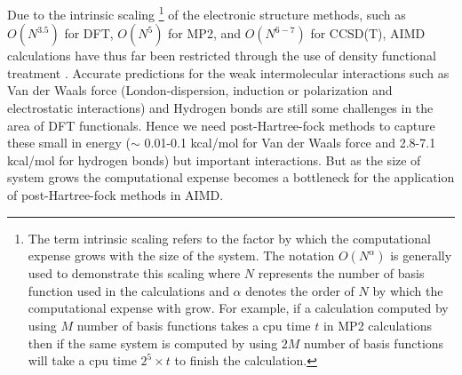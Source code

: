 Due to the intrinsic scaling \footnote{The term intrinsic scaling refers to the factor by
which the computational expense grows with the size of the system. The notation $O(N^{\alpha})$
is generally used to demonstrate this scaling where $N$ represents the number of basis function
used in the calculations and $\alpha$ denotes the order of $N$ by which the computational expense
with grow. For example, if a calculation computed by using $M$ number of basis functions takes
a cpu time $t$ in MP2 calculations then if the same system is computed by using $2M$ number of
basis functions will take a cpu time $2^{5} \times t$ to finish the calculation.} of the
electronic structure methods, such as 
$O(N^{3.5})$ for DFT, $O(N^5)$ for MP2, and $O(N^{6-7})$ for CCSD(T), AIMD calculations
have thus far been restricted through the use of density functional treatment 
\cite{Jutter-2D-MOFs-on-water-DFT-AIMD,Gerber-AIMD-atmospheric-2,Gerber-AIMD-atmospheric,
Hutter-Review,Kirchner-Hutter-Aimd-Apps}. Accurate predictions for the weak intermolecular
interactions such as Van der Waals force (London-dispersion, induction or polarization and
electrostatic interactions) and Hydrogen bonds are still some challenges in the area of DFT
functionals. Hence we need post-Hartree-fock methods to capture these small in energy
($\sim$ 0.01-0.1 kcal/mol for Van der Waals force and 2.8-7.1 kcal/mol for hydrogen
bonds) but important interactions. But as the size of system grows the computational expense
becomes a bottleneck for the application of post-Hartree-fock methods in AIMD.

